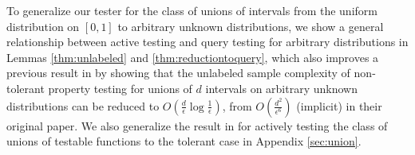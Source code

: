 


To generalize our tester for the class of unions of intervals from the uniform distribution on $[0,1]$ to arbitrary unknown distributions, we show a general relationship between active testing and query testing for arbitrary distributions in Lemmas \ref{thm:unlabeled} and \ref{thm:reductiontoquery}, which also improves a previous result in \citep{BBBY12} by showing that the unlabeled sample complexity of non-tolerant property testing for unions of $d$ intervals on arbitrary unknown distributions can be reduced to $O(\frac{d}{\epsilon}\log\frac{1}{\epsilon})$, from $O(\frac{d^2}{\epsilon^6})$ (implicit) in their original paper. We also generalize the result in \citep{BBBY12} for actively testing the class of unions of testable functions to the tolerant case in Appendix \ref{sec:union}.
